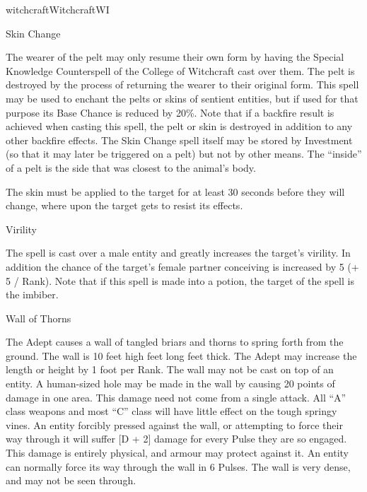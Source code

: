 \begin{college}[1.1]{witchcraft}{Witchcraft}{WI}
\begin{spell}[S-17]{Skin Change}
\begin{effects}
The wearer of the pelt may only resume their own form by having the
Special Knowledge Counterspell of the College of Witchcraft cast over
them.  The pelt is destroyed by the process of returning the wearer to
their original form.  This spell may be used to enchant the pelts or
skins of sentient entities, but if used for that purpose its Base
Chance is reduced by 20\%.  Note that if a backfire result is achieved
when casting this spell, the pelt or skin is destroyed in addition to
any other backfire effects.  The Skin Change spell itself may be
stored by Investment (so that it may later be triggered on a pelt)
but not by other means.  The ``inside'' of a pelt is the side that was
closest to the animal's body.

The skin must be applied to the target for at least 30 seconds before
they will change, where upon the target gets to resist its effects. 
\end{effects}
\end{spell}

\begin{spell}[S-18]{Virility}

\begin{effects}
The spell is cast over a male entity and greatly increases the
target's virility.  In addition the chance of the target's female
partner conceiving is increased by 5 (+ 5 / Rank).  Note that if this
spell is made into a potion, the target of the spell is the imbiber.
\end{effects}
\end{spell}

\begin{spell}[S-19]{Wall of Thorns}

\begin{effects}
The Adept causes a wall of tangled briars and thorns to spring forth
from the ground.  The wall is 10 feet high  feet long  feet
thick.  The Adept may increase the length or height by 1 foot per
Rank.  The wall may not be cast on top of an entity.  A human-sized
hole may be made in the wall by causing 20 points of damage in one
area.  This damage need not come from a single attack.  All ``A''
class weapons and most ``C'' class will have little effect on the
tough springy vines.  An entity forcibly pressed against the wall, or
attempting to force their way through it will suffer [D + 2] damage
for every Pulse they are so engaged.  This damage is entirely
physical, and armour may protect against it.  An entity can normally
force its way through the wall in 6 Pulses.  The wall is very dense,
and may not be seen through.
\end{effects}
\end{spell}


\end{college}
